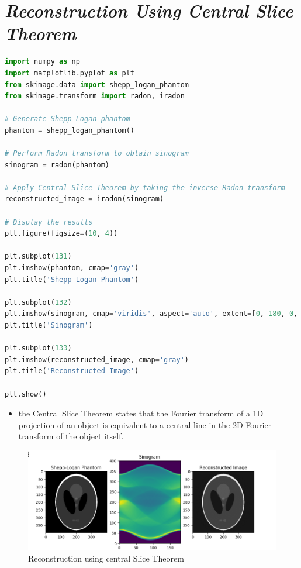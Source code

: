 \documentclass{article}
\begin{document}
\section{\textit{Reconstruction Using Central Slice Theorem}}
\begin{lstlisting}[language=Python, style=python, caption={Reconstructing Sinogram using Central Slice Theorem}]
import numpy as np
import matplotlib.pyplot as plt
from skimage.data import shepp_logan_phantom
from skimage.transform import radon, iradon

# Generate Shepp-Logan phantom
phantom = shepp_logan_phantom()

# Perform Radon transform to obtain sinogram
sinogram = radon(phantom)

# Apply Central Slice Theorem by taking the inverse Radon transform
reconstructed_image = iradon(sinogram)

# Display the results
plt.figure(figsize=(10, 4))

plt.subplot(131)
plt.imshow(phantom, cmap='gray')
plt.title('Shepp-Logan Phantom')

plt.subplot(132)
plt.imshow(sinogram, cmap='viridis', aspect='auto', extent=[0, 180, 0, sinogram.shape[0]])
plt.title('Sinogram')

plt.subplot(133)
plt.imshow(reconstructed_image, cmap='gray')
plt.title('Reconstructed Image')

plt.show()

\end{lstlisting}
\begin{itemize}
    \item the Central Slice Theorem states that the Fourier transform of a 1D projection of an object is equivalent to a central line  in the 2D Fourier transform of the object itself.
\end{itemize}
\begin{figure}
    \centering
    \includegraphics[width=\linewidth]{Screenshot from 2024-02-05 23-46-27.png}
    \caption{Reconstruction using central Slice Theorem}
    \label{fig:enter-label}
\end{figure}
\newpage
\end{document}

